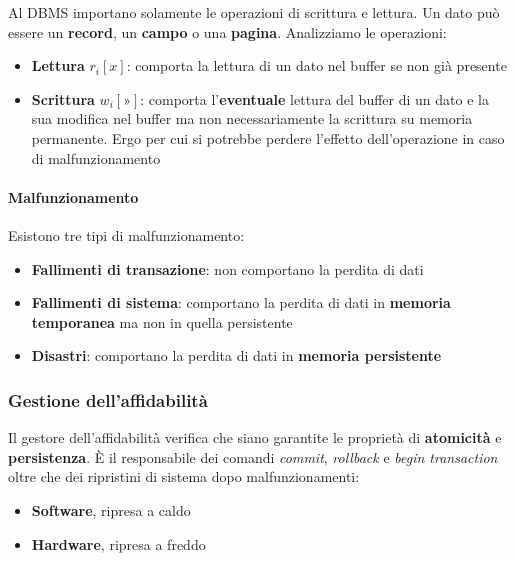 Al DBMS importano solamente le operazioni di scrittura e lettura. Un dato può essere un \textbf{record}, un \textbf{campo} o una \textbf{pagina}. Analizziamo le operazioni:
\begin{itemize}
	\item \textbf{Lettura} $r_i[x]$: comporta la lettura di un dato nel buffer se non già presente
	\item \textbf{Scrittura} $w_i[»]$: comporta l'\textbf{eventuale} lettura del buffer di un dato e la sua modifica nel buffer ma non necessariamente la scrittura su memoria permanente. Ergo per cui si potrebbe perdere l'effetto dell'operazione in caso di malfunzionamento
\end{itemize}
\paragraph{Malfunzionamento}
Esistono tre tipi di malfunzionamento:
\begin{itemize}
	\item \textbf{Fallimenti di transazione}: non comportano la perdita di dati
	\item \textbf{Fallimenti di sistema}: comportano la perdita di dati in \textbf{memoria temporanea} ma non in quella persistente
	\item \textbf{Disastri}: comportano la perdita di dati in \textbf{memoria persistente}
\end{itemize}
\subsubsection{Gestione dell'affidabilità}
Il gestore dell'affidabilità verifica che siano garantite le proprietà di  \textbf{atomicità} e \textbf{persistenza}. È il responsabile dei comandi \textit{commit}, \textit{rollback} e \textit{begin transaction} oltre che dei ripristini di sistema dopo malfunzionamenti:
\begin{itemize}
	\item \textbf{Software}, ripresa a caldo
	\item \textbf{Hardware}, ripresa a freddo
\end{itemize}
